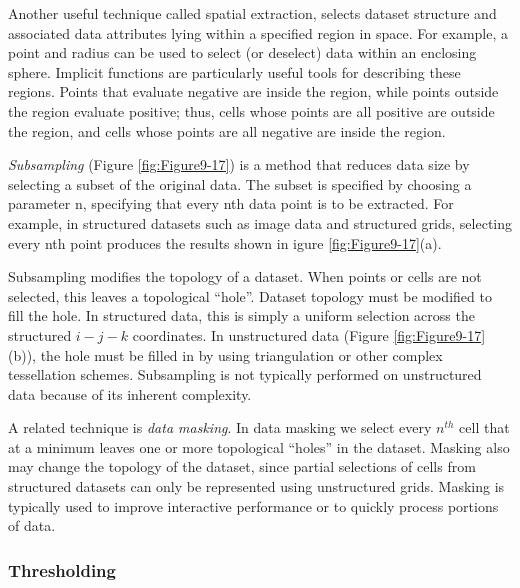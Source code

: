 Another useful technique called spatial extraction, selects dataset structure and associated data attributes lying within a specified region in space. For example, a point and radius can be used to select (or deselect) data within an enclosing sphere. Implicit functions are particularly useful tools for describing these regions. Points that evaluate negative are inside the region, while points outside the region evaluate positive; thus, cells whose points are all positive are outside the region, and cells whose points are all negative are inside the region.

\emph{Subsampling} (Figure \ref{fig:Figure9-17}) is a method that reduces data size by selecting a subset of the original data. The subset is specified by choosing a parameter n, specifying that every nth data point is to be extracted. For example, in structured datasets such as image data and structured grids, selecting every nth point produces the results shown in igure \ref{fig:Figure9-17}(a).

Subsampling modifies the topology of a dataset. When points or cells are not selected, this leaves a topological ``hole''. Dataset topology must be modified to fill the hole. In structured data, this is simply a uniform selection across the structured $i-j-k$ coordinates. In unstructured data (Figure \ref{fig:Figure9-17}(b)), the hole must be filled in by using triangulation or other complex tessellation schemes. Subsampling is not typically performed on unstructured data because of its inherent complexity.

A related technique is \emph{data masking}. In data masking we select every $n^{th}$ cell that at a minimum leaves one or more topological ``holes'' in the dataset. Masking also may change the topology of the dataset, since partial selections of cells from structured datasets can only be represented using unstructured grids. Masking is typically used to improve interactive performance or to quickly process portions of data.

\subsubsection{Thresholding}
\label{subsubsec:thresholding}

